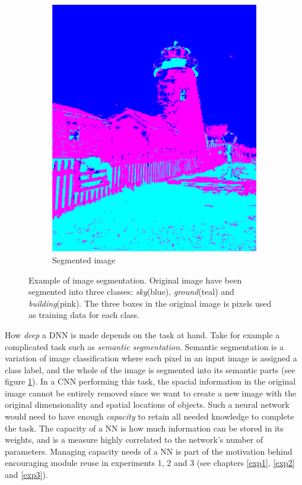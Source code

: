 \begin{figure}
\begin{subfigure}[ht]{0.49\linewidth}
        \includegraphics[width=\linewidth]{Chapters/2.Background/figures/segmentation.png}
        \caption{Segmented image}
    \end{subfigure}
    \caption[Image segmentation]{Example of image segmentation. Original image have been segmented into three classes: \textit{sky}(blue), \textit{ground}(teal) and \textit{building}(pink). The three boxes in the original image is pixels used as training data for each class.}
    \label{fig:semanticsegmentation}
\end{figure}

How \textit{deep} a DNN is made depends on the task at hand. Take for example a complicated task such as \textit{semantic segmentation}. Semantic segmentation is a variation of image classification where each pixel in an input image is assigned a class label, and the whole of the image is segmented into its semantic parts (see figure \ref{fig:semanticsegmentation}). In a CNN performing this task, the spacial information in the original image cannot be entirely removed since we want to create a new image with the original dimensionality and spatial locations of objects. Such a neural network would need to have enough \textit{capacity} to retain all needed knowledge to complete the task. The capacity of a NN is how much information can be stored in its weights, and is a measure highly correlated to the network's number of parameters. Managing capacity needs of a NN is part of the motivation behind encouraging module reuse in experiments 1, 2 and 3 (see chapters \ref{exp1}, \ref{exp2} and \ref{exp3}).


